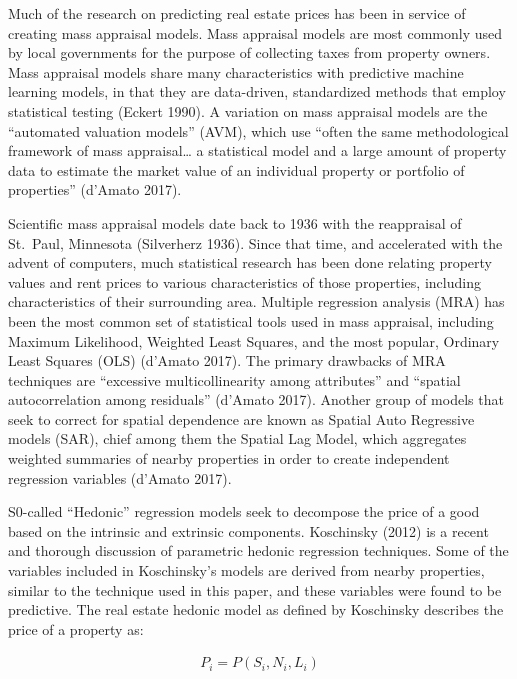 \documentclass[12pt,]{article}
\begin{document}
Much of the research on predicting real estate prices has been in
service of creating mass appraisal models. Mass appraisal models are
most commonly used by local governments for the purpose of collecting
taxes from property owners. Mass appraisal models share many
characteristics with predictive machine learning models, in that they
are data-driven, standardized methods that employ statistical testing
(Eckert 1990). A variation on mass appraisal models are the ``automated
valuation models'' (AVM), which use ``often the same methodological
framework of mass appraisal\ldots{} a statistical model and a large
amount of property data to estimate the market value of an individual
property or portfolio of properties'' (d'Amato 2017).

Scientific mass appraisal models date back to 1936 with the reappraisal
of St.~Paul, Minnesota (Silverherz 1936). Since that time, and
accelerated with the advent of computers, much statistical research has
been done relating property values and rent prices to various
characteristics of those properties, including characteristics of their
surrounding area. Multiple regression analysis (MRA) has been the most
common set of statistical tools used in mass appraisal, including
Maximum Likelihood, Weighted Least Squares, and the most popular,
Ordinary Least Squares (OLS) (d'Amato 2017). The primary drawbacks of
MRA techniques are ``excessive multicollinearity among attributes'' and
``spatial autocorrelation among residuals'' (d'Amato 2017). Another
group of models that seek to correct for spatial dependence are known as
Spatial Auto Regressive models (SAR), chief among them the Spatial Lag
Model, which aggregates weighted summaries of nearby properties in order
to create independent regression variables (d'Amato 2017).

S0-called ``Hedonic'' regression models seek to decompose the price of a
good based on the intrinsic and extrinsic components. Koschinsky (2012)
is a recent and thorough discussion of parametric hedonic regression
techniques. Some of the variables included in Koschinsky's models are
derived from nearby properties, similar to the technique used in this
paper, and these variables were found to be predictive. The real estate
hedonic model as defined by Koschinsky describes the price of a property
as:

\[
\begin{aligned}
 P_i = P(S_i, N_i, L_i)
\end{aligned}
\]
\end{document}
